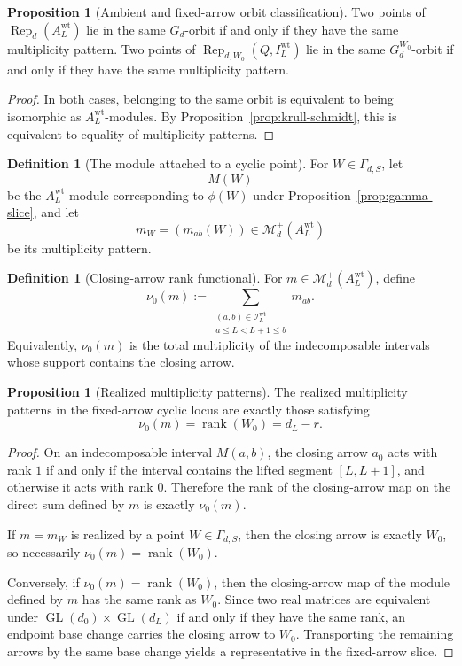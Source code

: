 \documentclass[11pt]{article}
\newcommand{\rk}{\operatorname{rank}}
\newcommand{\GL}{\operatorname{GL}}
\newcommand{\Rep}{\operatorname{Rep}}
\theoremstyle{definition}
\newtheorem{proposition}[theorem]{Proposition}
\newtheorem{definition}[theorem]{Definition}
\begin{document}
\begin{proposition}[Ambient and fixed-arrow orbit classification]
\label{prop:multiplicity-orbits}
Two points of \(\Rep_d(A_L^{\mathrm{wt}})\) lie in the same \(G_d\)-orbit if and
only if they have the same multiplicity pattern. Two points of
\(\Rep_{d,W_0}(Q,I_L^{\mathrm{wt}})\) lie in the same \(G_d^{W_0}\)-orbit if and
only if they have the same multiplicity pattern.
\end{proposition}

\begin{proof}
In both cases, belonging to the same orbit is equivalent to being isomorphic as
\(A_L^{\mathrm{wt}}\)-modules. By Proposition~\ref{prop:krull-schmidt}, this is
equivalent to equality of multiplicity patterns.
\end{proof}

\begin{definition}[The module attached to a cyclic point]
For \(W\in \Gamma_{d,S}\), let
\[
M(W)
\]
be the \(A_L^{\mathrm{wt}}\)-module corresponding to \(\phi(W)\) under
Proposition~\ref{prop:gamma-slice}, and let
\[
m_W=(m_{ab}(W))\in \mathcal M_d^+(A_L^{\mathrm{wt}})
\]
be its multiplicity pattern.
\end{definition}

\begin{definition}[Closing-arrow rank functional]
For \(m\in \mathcal M_d^+(A_L^{\mathrm{wt}})\), define
\[
\nu_0(m)
:=
\sum_{\substack{(a,b)\in \mathcal I_L^{\mathrm{wt}}\\ a\leq L < L+1\leq b}}
m_{ab}.
\]
Equivalently, \(\nu_0(m)\) is the total multiplicity of the indecomposable
intervals whose support contains the closing arrow.
\end{definition}

\begin{proposition}[Realized multiplicity patterns]
\label{prop:realized-m}
The realized multiplicity patterns in the fixed-arrow cyclic locus are exactly
those satisfying
\[
\nu_0(m)=\rk(W_0)=d_L-r.
\]
\end{proposition}

\begin{proof}
On an indecomposable interval \(M(a,b)\), the closing arrow \(a_0\) acts with
rank \(1\) if and only if the interval contains the lifted segment
\([L,L+1]\), and otherwise it acts with rank \(0\). Therefore the rank of the
closing-arrow map on the direct sum defined by \(m\) is exactly \(\nu_0(m)\).

If \(m=m_W\) is realized by a point \(W\in \Gamma_{d,S}\), then the closing
arrow is exactly \(W_0\), so necessarily \(\nu_0(m)=\rk(W_0)\).

Conversely, if \(\nu_0(m)=\rk(W_0)\), then the closing-arrow map of the module
defined by \(m\) has the same rank as \(W_0\). Since two real matrices are
equivalent under \(\GL(d_0)\times \GL(d_L)\) if and only if they have the same
rank, an endpoint base change carries the closing arrow to \(W_0\). Transporting
the remaining arrows by the same base change yields a representative in the
fixed-arrow slice.
\end{proof}
\end{document}
